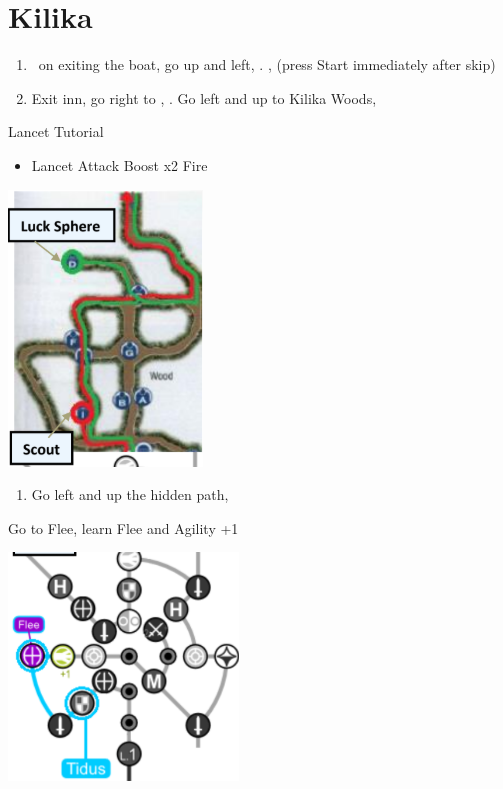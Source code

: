 \chapter{Kilika}

\begin{enumerate}
	\item \sd\ on exiting the boat, go up and left, \sd. \skippablefmv[2:00], (press Start immediately after skip) \sd
	\item Exit inn, go right to \wakka, \sd. Go left and up to Kilika Woods, \sd
\end{enumerate}
\begin{battle}{Lancet Tutorial}
	\begin{itemize}
		\item \sd
		\kimahrif Lancet
		\tidusf Attack
		\summon{\valefor}
		\valeforf Boost x2
		\valeforf Fire
	\end{itemize}
\end{battle}
\includegraphics{graphics/kilikamap}
\begin{enumerate}[resume]
	\item Go left and up the hidden path, 
\end{enumerate}
\begin{spheregrid}
	\begin{itemize}
		\tidusf Go to Flee, learn Flee and Agility +1
	\end{itemize}
	\includegraphics{graphics/tidusflee}
\end{spheregrid}
